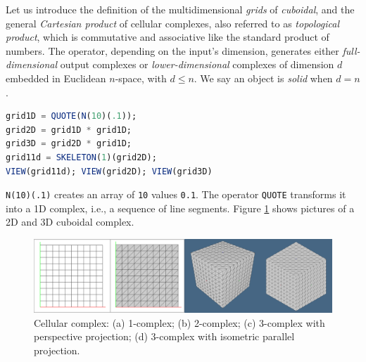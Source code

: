 \documentclass{juliacon}
\begin{document}
Let us introduce the definition of the multidimensional \emph{grids} of \emph{cuboidal}, and the general \emph{Cartesian product} {\tt *} of cellular complexes, also referred to as \emph{topological product}, which is commutative and associative like the standard product of numbers.
The {\tt *} operator, depending on the input’s dimension, generates either \emph{full-dimensional} output complexes or \emph{lower-dimensional} complexes of dimension $d$ embedded in Euclidean $n$-space, with $d \leq n$. We say an object is \textit{solid} when $d = n$.


\begin{lstlisting}[language = Julia,numbers=none,label={lst:exmpl7},
caption={Cartesian Product of 0/1 chain instances.}
]
grid1D = QUOTE(N(10)(.1));
grid2D = grid1D * grid1D;
grid3D = grid2D * grid1D;
grid11d = SKELETON(1)(grid2D);
VIEW(grid11d); VIEW(grid2D); VIEW(grid3D)
\end{lstlisting}
{\tt N(10)(.1)} creates an array of {\tt 10} values {\tt 0.1}. The operator {\tt QUOTE} transforms it into a 1D complex, i.e., a sequence of line segments. Figure \ref{ex:build1D} shows pictures of a 2D and 3D cuboidal complex.
\begin{figure}[h]
	\includegraphics[width=\linewidth]{figs/four-grids}%
	\caption{Cellular complex: (a) 1-complex; (b) 2-complex; (c) 3-complex with perspective projection; (d) 3-complex with isometric parallel projection.}    \label{ex:build1D}
\end{figure}
\end{document}
